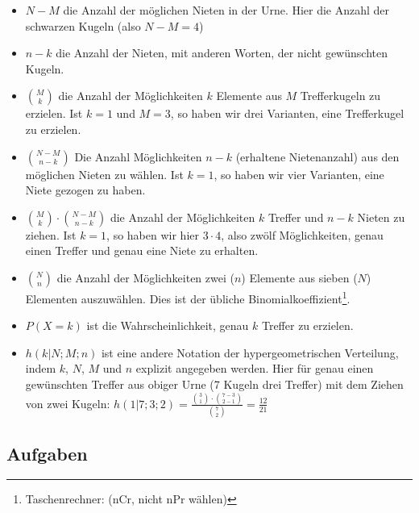 \begin{itemize}
\item $N-M$ die Anzahl der möglichen Nieten in der Urne. Hier die Anzahl der schwarzen Kugeln (also $N-M = 4$)
\item $n-k$ die Anzahl der Nieten, mit anderen Worten, der nicht gewünschten Kugeln.
\item $M\choose k$ die Anzahl der Möglichkeiten $k$ Elemente aus $M$ Trefferkugeln zu erzielen. Ist \zB $k=1$ und $M=3$, so haben wir drei Varianten, eine Trefferkugel zu erzielen.
\item ${N-M}\choose {n-k}$ Die Anzahl Möglichkeiten $n-k$ (erhaltene Nietenanzahl) aus den möglichen Nieten zu wählen. Ist \zB $k=1$, so haben wir vier Varianten, eine Niete gezogen zu haben.
\item ${M\choose k} \cdot{} {{N-M}\choose {n-k}}$ die Anzahl der Möglichkeiten $k$ Treffer und $n-k$ Nieten zu ziehen. Ist \zB $k=1$, so haben wir hier $3\cdot{}4$, also zwölf Möglichkeiten, genau einen Treffer und genau eine Niete zu erhalten.
\item $N \choose n$ die Anzahl der Möglichkeiten zwei ($n$) Elemente
  aus sieben ($N$) Elementen auszuwählen. Dies ist der übliche
  Binomialkoeffizient\footnote{Taschenrechner:  (nCr, nicht nPr wählen)}.
\item $P(X=k)$ ist die Wahrscheinlichkeit, genau $k$ Treffer zu erzielen.
\item $h(k|N;M;n)$ ist eine andere Notation der hypergeometrischen Verteilung, indem $k$, $N$, $M$ und $n$ explizit angegeben werden. Hier \zB für genau einen gewünschten Treffer aus obiger Urne (7 Kugeln drei Treffer) mit dem Ziehen von zwei Kugeln: $h(1|7;3;2)=\frac{{3 \choose 1} \cdot{} {{7-3}\choose {2-1}  }   }{{ 7 \choose 2 }}=\frac{12}{21}$
\end{itemize}

\subsection*{Aufgaben}

\newpage

